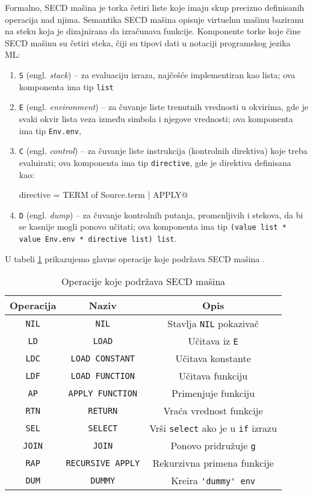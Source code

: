 Formalno, SECD mašina je torka četiri liste koje imaju skup precizno definisanih operacija nad njima. Semantika SECD mašina opisuje virtuelnu mašinu baziranu na steku koja je dizajnirana da izračunava funkcije. Komponente torke koje čine SECD mašinu su četiri steka, čiji su tipovi dati u notaciji programskog jezika ML:
\begin{enumerate}
	\item \verb|S| (engl. \textit{stack}) -- za evaluaciju izraza, najčešće implementiran kao lista; ova komponenta ima tip \verb|list|  
	\item \verb|E| (engl. \textit{environment}) -- za čuvanje liste trenutnih vrednosti u okvirima, gde je svaki okvir lista veza između simbola i njegove vrednosti; ova komponenta ima tip \verb|Env.env|,
	\item \verb|C| (engl. \textit{control}) -- za čuvanje liste instrukcija (kontrolnih direktiva) koje treba evaluirati; ova komponenta ima tip \verb|directive|, gde je direktiva definisana kao:
	\begin{center}
		\verb@datatype directive = TERM of Source.term | APPLY@
	\end{center}
	\item \verb|D| (engl. \textit{dump}) -- za čuvanje kontrolnih putanja, promenljivih i stekova, da bi se kasnije mogli ponovo učitati; ova komponenta ima tip \verb|(value list * value Env.env * directive list) list|.
\end{enumerate}

U tabeli \ref{tab:tabelaInstr} prikazujemo glavne operacije koje podržava SECD mašina \cite{introduction-fp-systems}.

\begin{table}[h!]
	\centering
	\label{tab:tabelaInstr}
	\caption{Operacije koje podržava SECD mašina}
	\begin{tabular}{|c|c|c|} \hline
		Operacija&Naziv&Opis\\ \hline
		\verb|NIL| & \verb|NIL| & Stavlja \verb|NIL| pokazivač\\ \hline
		\verb|LD| & \verb|LOAD| & Učitava iz \verb|E| \\ \hline
		\verb|LDC| & \verb|LOAD CONSTANT| & Učitava konstante\\ \hline
		\verb|LDF| & \verb|LOAD FUNCTION| & Učitava funkciju \\ \hline
		\verb|AP| & \verb|APPLY FUNCTION| & Primenjuje funkciju\\ \hline
		\verb|RTN| & \verb|RETURN| & Vraća vrednost funkcije \\ \hline
		\verb|SEL| & \verb|SELECT| & Vrši \verb|select| ako je u \verb|if| izrazu\\ \hline
		\verb|JOIN| & \verb|JOIN| & Ponovo pridružuje \verb|g|\\ \hline
		\verb|RAP| & \verb|RECURSIVE APPLY| & Rekurzivna primena funkcije\\ \hline
		\verb|DUM| & \verb|DUMMY| & Kreira \verb|'dummy' env| \\ \hline
	\end{tabular}
\end{table}


